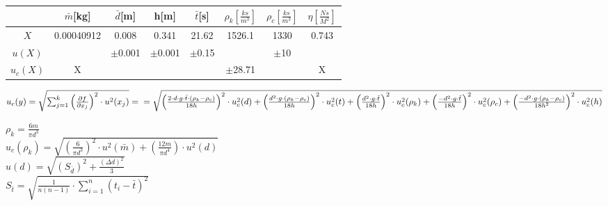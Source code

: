\documentclass{article}
\begin{document}
\begin{tabular}{|c|c|c|c|c|c|c|c|}
    \hline
    \cellcolor{cyan!50}&\cellcolor{cyan!50}$\bar{m}$[kg]&\cellcolor{cyan!50}$\bar{d}$[m]&\cellcolor{cyan!50}h[m]&\cellcolor{cyan!50}$\bar{t}$[s]&\cellcolor{cyan!50}$\rho_{k}\left[\frac{ks}{m^{3}}\right]$&\cellcolor{cyan!50}$\rho_{c}$$\left[\frac{ks}{m^{3}}\right]$&\cellcolor{cyan!50}$\eta\left[\frac{Ns}{M^{2}}\right]$\\
    \hline 
    \cellcolor{cyan!50}$X$ &\cellcolor{cyan!50}0.00040912&\cellcolor{cyan!50}0.008&\cellcolor{cyan!50}0.341&\cellcolor{cyan!50}21.62&\cellcolor{cyan!50}1526.1&\cellcolor{cyan!50}1330&\cellcolor{cyan!50}0.743\\\hline
    \cellcolor{cyan!50}$u(X)$&\cellcolor{gray}&\cellcolor{cyan!50}$\pm$0.001&\cellcolor{cyan!50}$\pm$0.001&\cellcolor{cyan!50}$\pm$0.15&\cellcolor{gray}&\cellcolor{cyan!50}$\pm$10&\cellcolor{gray}\\\hline
    \cellcolor{cyan!50}$u_{c}(X)$&\cellcolor{cyan!50}X&\cellcolor{gray}&\cellcolor{gray}&\cellcolor{gray}&\cellcolor{cyan!50}$\pm$28.71&\cellcolor{gray}&\cellcolor{cyan!50}X\\\hline
\end{tabular}

$u_{c}(y)=\sqrt{\sum^{k}_{j=1}\left(\frac{\partial f}{\partial x_{j}}\right)^{2}\cdot u^{2}(x_{j})}=  \\= \sqrt{\left(\frac{ 2\cdot d\cdot g\cdot \bar{t}\cdot (\rho_{k}-\rho_{c})  }{ 18h  }\right)^{2}\cdot u_{c}^{2}( d  )+
\left(\frac{ d^{2}\cdot g\cdot (\rho_{k}-\rho_{c})  }{ 18h  }\right)^{2}\cdot u_{c}^{2}( t  )+
\left(\frac{ d^{2}\cdot g\cdot \bar{t}  }{ 18h  }\right)^{2}\cdot u_{c}^{2}( \rho_{k}  )+
\left(\frac{ -d^{2}\cdot g\cdot \bar{t}  }{ 18h  }\right)^{2}\cdot u_{c}^{2}( \rho_{c}  )+
\left(\frac{ -d^{2}\cdot g\cdot (\rho_{k}-\rho_{c})  }{ 18h^{2}  }\right)^{2}\cdot u_{c}^{2}( h  )   }$

$\rho_{k}=\frac{6m}{\pi d^{3}}$\\
$u_{c}(\rho_{k})=\sqrt{\left(\frac{6}{\pi d^{3}}\right)^{2}\cdot u^{2}(\bar{m}) + \left(\frac{12m}{\pi d^{4}}\right)\cdot u^{2}(d)}$\\
$u(d)=\sqrt{\left(S_{\bar{d}}\right)^{2}+\frac{(\Delta d)^{2}}{3}}$\\
$S_{\bar{t}}=\sqrt{\frac{1}{n(n-1)}\cdot\sum^{n}_{i=1}\left(t_{i}-\bar{t}\right)^{2}}$\\
\end{document}
